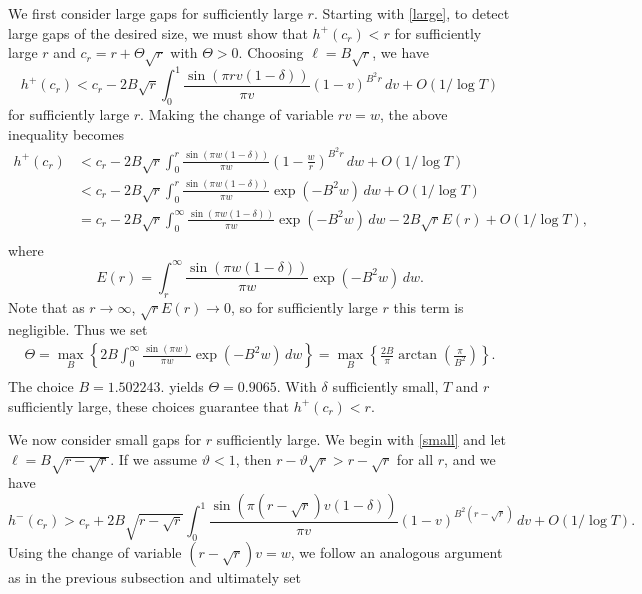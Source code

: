 \documentclass[oneside]{amsart}
\begin{document}
We first consider large gaps for sufficiently large $r$. Starting with \eqref{large}, to detect large gaps of the desired size, we must show that $h^+(c_r) < r$ for sufficiently large $r$ and $c_r = r + \Theta\sqrt{r}$ with $\Theta>0$. Choosing $\ell = B\sqrt{r}$, we have
\[
h^+(c_r) < c_r -2B\sqrt{r} \int_{0}^{1}\frac{\sin(\pi r v(1-\delta))}{\pi v}(1-v)^{B^2r}\,dv + O(1/\log T)
\]
for sufficiently large $r$. Making the change of variable $rv = w$, the above inequality becomes
\begin{equation}\label{argument}\begin{split}
h^+(c_r) &< c_r -2B\sqrt{r} \int_{0}^{r}\frac{\sin(\pi w(1-\delta))}{\pi w}\left(1-\frac{w}{r}\right)^{B^2r}\,dw + O(1/\log T)\\
&< c_r -2B\sqrt{r} \int_{0}^{r}\frac{\sin(\pi w(1-\delta))}{\pi w}\exp\left(-B^2w\right)\,dw + O(1/\log T)\\
&=c_r -2B\sqrt{r} \int_{0}^{\infty}\frac{\sin(\pi w(1-\delta))}{\pi w}\exp\left(-B^2w\right)\,dw -2B\sqrt{r}E(r)+ O(1/\log T), \\
\end{split}\end{equation}
where
\[
E(r) =\int_{r}^{\infty}\frac{\sin(\pi w(1-\delta))}{\pi w}\exp\left(-B^2w\right)\,dw.
\]
Note that as $r\to \infty$, $\sqrt{r}E(r) \to 0$, so for sufficiently large $r$ this term is negligible. Thus we set
\begin{equation*}\begin{split}
\Theta = \max_{B}\left\{2B\int_{0}^{\infty}\frac{\sin(\pi w)}{\pi w}\exp\left(-B^2w\right)\,dw\right\} = \max_{B}\left\{\frac{2B}{\pi}\arctan\left(\frac{\pi}{B^2} \right)\right\}.  \\
\end{split}\end{equation*}
The choice $B=1.502243.$ yields $\Theta = 0.9065$. With $\delta$ sufficiently small, $T$ and $r$ sufficiently large, these choices guarantee that $h^+(c_r) < r$. 




We now consider small gaps for $r$ sufficiently large. We begin with \eqref{small} and let $\ell = B\sqrt{r-\sqrt{r}}$. If we assume $\vartheta <1$, then $r-\vartheta \sqrt{r} > r - \sqrt{r}$ for all $r$, and we have
\[
h^-(c_r) > c_r +2B\sqrt{r-\sqrt{r}} \int_{0}^{1}\frac{\sin(\pi (r-\sqrt{r})v(1-\delta))}{\pi v}(1-v)^{B^2(r-\sqrt{r})}\,dv + O(1/\log T).
\]
Using the change of variable $(r-\sqrt{r})v=w$, we follow an analogous argument as in the previous subsection and ultimately set
\end{document}
